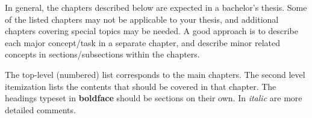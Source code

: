 
\abstract

\begin{instructions}
In general, the chapters described below are expected in a bachelor's thesis.
Some of the listed chapters may not be applicable to your thesis, and additional chapters covering special topics may be needed.
A good approach is to describe each major concept/task in a separate chapter, and describe minor related concepts in sections/subsections within the chapters.

The top-level (numbered) list corresponds to the main chapters.
The second level itemization lists the contents that should be covered in that chapter.
The headings typeset in \textbf{boldface} should be sections on their own.
In \emph{italic} are more detailed comments.
\end{instructions}

\lipsum[3]

